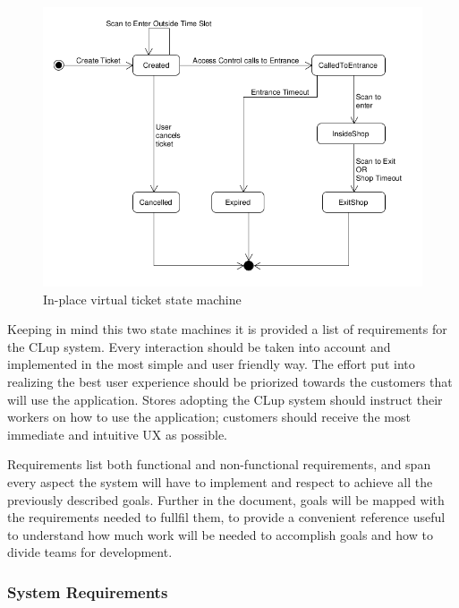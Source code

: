 \begin{figure}[H]
    \centering
    \includegraphics[width=\textwidth]{Images/UML_in_place_virtual_ticket.png}
    \caption{ \label{fig:Booked_Ticket_State}In-place virtual ticket state machine}
\end{figure}

Keeping in mind this two state machines it is provided a list of requirements for the CLup system.
Every interaction should be taken into account and implemented in the most simple and user friendly way.
The effort put into realizing the best user experience should be priorized towards the customers that will use the application. Stores adopting the CLup system should instruct their workers on how to use the application; customers should receive the most immediate and intuitive UX as possible.

Requirements list both functional and non-functional requirements, and span every aspect the system will have to implement and respect to achieve all the previously described goals. Further in the document, goals will be mapped with the requirements needed to fullfil them, to provide a convenient reference useful to understand how much work will be needed to accomplish goals and how to divide teams for development.

\vfill

\subsubsection{System Requirements}

